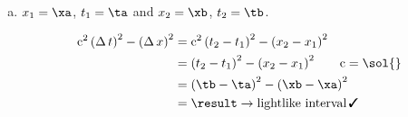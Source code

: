 \documentclass[pagesize,headsepline,10pt,parskip=half]{scrreprt}
\newcommand{\cmark}{\, \text{\ding{51}}}
\newcommand*\mdelta[1]{\ensuremath{\mathrm{\Delta\,}#1}}
\newcommand{\const}[1]{\mathrm{#1}}
\renewcommand{\c}{\const{c}}
\begin{document}
\begin{enumerate}[(a)]
        \item $x_1 = \xa$, $t_1 = \ta$ and $x_2 = \xb$, $t_2 = \tb$.
          \begin{samepage}
            \spacetimeintv{\result}{\xa}{\ta}{\xb}{\tb}
            \begin{align*}
              \c^2 \, {(\mdelta{t})}^2 - {(\mdelta{x})}^2
                &= \c^2 \, {(t_2 - t_1)}^2 - {(x_2 - x_1)}^2\\
                &= {(t_2 - t_1)}^2 - {(x_2 - x_1)}^2 \qquad \c = \sol{}\\
                &= {\left(\tb - \ta\right)}^2 - {\left(\xb - \xa\right)}^2\\
                &= \result \rightarrow \text{lightlike interval} \cmark
            \end{align*}
          \end{samepage}
      \end{enumerate}

    \clearpage
\end{document}
